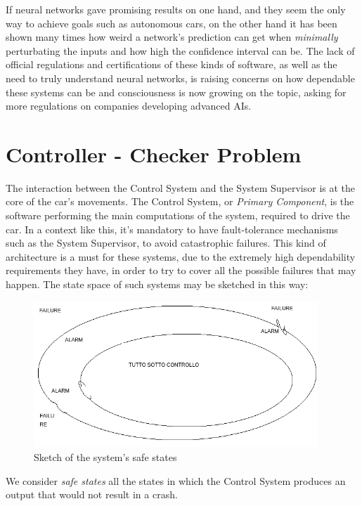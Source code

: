 If neural networks gave promising results on one hand, and they seem the only way to achieve goals such as autonomous cars, on the other hand it has been shown many times how weird a network's prediction can get when \textsl{minimally} perturbating the inputs\cite{stupidnn} and how high the confidence interval can be.\cite{foolnn} The lack of official regulations and certifications of these kinds of software, as well as the need to truly understand neural networks, is raising concerns on how dependable these systems can be and consciousness is now growing on the topic, asking for more regulations on companies developing advanced AIs.\cite{elonmusk}\newline

\section{Controller - Checker Problem}


The interaction between the Control System and the System Supervisor is at the core of the car's movements. The Control System, or \textsl{Primary Component}, is the software performing the main computations of the system, required to drive the car. In a context like this, it's mandatory to have fault-tolerance mechanisms such as the System Supervisor, to avoid catastrophic failures. This kind of architecture is a must for these systems, due to the extremely high dependability requirements they have, in order to try to cover all the possible failures that may happen. The state space of such systems may be sketched in this way:

\begin{figure}[h!]
	\includegraphics[height=5.5cm,width=\textwidth]{img/state-space.png}
	\caption{Sketch of the system's safe states}
\end{figure}

We consider \textsl{safe states} all the states in which the Control System produces an output that would not result in a crash.

